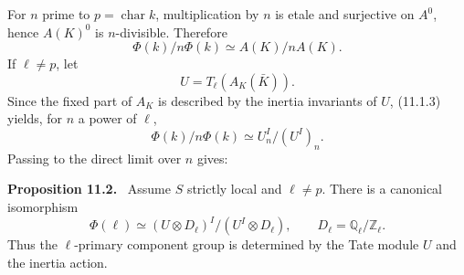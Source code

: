 \documentclass[11pt]{article}
\newcommand{\Dl}{D_\ell}
\newcommand{\QlZl}{\mathbb Q_\ell/\mathbb Z_\ell}
\newenvironment{statement}[1]{\par\medskip\noindent\textbf{#1.}\ }{\par\medskip}
\begin{document}
For \(n\) prime to \(p=\operatorname{char}k\), multiplication by \(n\) is etale and surjective on \(A^0\), hence \(A(K)^0\) is \(n\)-divisible.  Therefore
\begin{equation}\tag{11.1.3}
        \Phi(k)/n\Phi(k)\simeq A(K)/nA(K).
\end{equation}
If \(\ell\ne p\), let
\begin{equation}\tag{11.1.5}
        U=T_\ell(A_K(\bar K)).
\end{equation}
Since the fixed part of \(A_K\) is described by the inertia invariants of \(U\), (11.1.3) yields, for \(n\) a power of \(\ell\),
\begin{equation}\tag{11.1.6}
        \Phi(k)/n\Phi(k)\simeq U_n^I/(U^I)_n.
\end{equation}
Passing to the direct limit over \(n\) gives:

\begin{statement}{Proposition 11.2}
Assume \(S\) strictly local and \(\ell\ne p\).  There is a canonical isomorphism
\begin{equation}\tag{11.2.1}
        \Phi(\ell)\simeq (U\otimes\Dl)^I/(U^I\otimes\Dl),
        \qquad \Dl=\QlZl.
\end{equation}
Thus the \(\ell\)-primary component group is determined by the Tate module \(U\) and the inertia action.
\end{statement}
\end{document}

